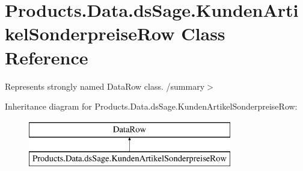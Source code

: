 \hypertarget{class_products_1_1_data_1_1ds_sage_1_1_kunden_artikel_sonderpreise_row}{}\section{Products.\+Data.\+ds\+Sage.\+Kunden\+Artikel\+Sonderpreise\+Row Class Reference}
\label{class_products_1_1_data_1_1ds_sage_1_1_kunden_artikel_sonderpreise_row}


Represents strongly named Data\+Row class. /summary$>$  


Inheritance diagram for Products.\+Data.\+ds\+Sage.\+Kunden\+Artikel\+Sonderpreise\+Row\+:\begin{figure}[H]
\begin{center}
\leavevmode
\includegraphics[height=2.000000cm]{class_products_1_1_data_1_1ds_sage_1_1_kunden_artikel_sonderpreise_row}
\end{center}
\end{figure}
